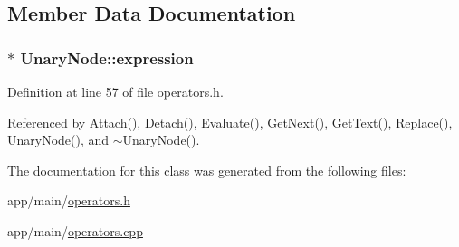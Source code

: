 \subsection{Member Data Documentation}
\subsubsection[{\texorpdfstring{expression}{expression}}]{$\ast$ Unary\+Node\+::expression\hspace{0.3cm}{\ttfamily [private]}}\hypertarget{classUnaryNode_a8041eeaa6edd32c1a2474c504de2889d}{}\label{classUnaryNode_a8041eeaa6edd32c1a2474c504de2889d}


Definition at line 57 of file operators.\+h.



Referenced by Attach(), Detach(), Evaluate(), Get\+Next(), Get\+Text(), Replace(), Unary\+Node(), and $\sim$\+Unary\+Node().



The documentation for this class was generated from the following files\+:\begin{DoxyCompactItemize}
\item 
app/main/\hyperlink{operators_8h}{operators.\+h}\item 
app/main/\hyperlink{operators_8cpp}{operators.\+cpp}\end{DoxyCompactItemize}
